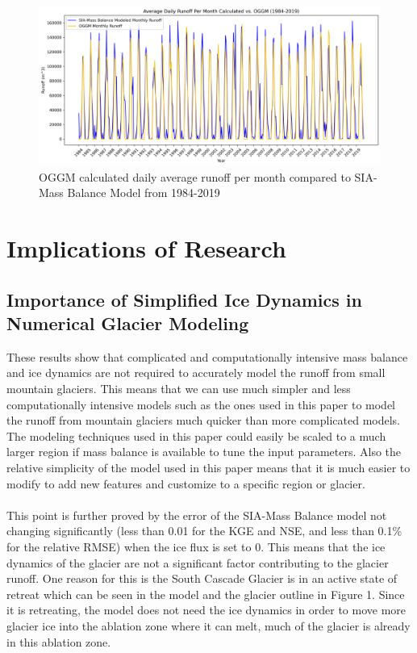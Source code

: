 \documentclass{article}
\begin{document}
\begin{figure}[h!]
    \includegraphics[width=1.3\textwidth]{Plots/oggm_vs_calculated.png}
    \caption{OGGM calculated daily average runoff per month compared to SIA-Mass Balance Model from 1984-2019}
    \label{fig:oggm_model_run_1984_2019}
\end{figure}
\FloatBarrier

\section{Implications of Research}
\subsection{Importance of Simplified Ice Dynamics in Numerical Glacier Modeling}
These results show that complicated and computationally intensive mass balance and ice dynamics are not required to accurately model the 
runoff from small mountain glaciers. This means that we can use much simpler and less computationally intensive models such as the ones used 
in this paper to model the runoff from mountain glaciers much quicker than more complicated models. The modeling techniques used in this paper could 
easily be scaled to a much larger region if mass balance is available to tune the input parameters. Also the relative simplicity of the model used in 
this paper means that it is much easier to modify to add new features and customize to a specific region or glacier.
\paragraph{}
This point is further proved by the error of the SIA-Mass Balance model not changing significantly (less than 0.01 for the KGE and NSE, and less than 
0.1\% for the relative RMSE) when 
the ice flux is set to 0. This means that the ice dynamics of the glacier are not a significant factor contributing to the glacier runoff. One reason 
for this is the South Cascade Glacier is in an active state of retreat which can be seen in the model and the 
glacier outline in Figure 1. Since it is retreating, the model does not need the ice dynamics in order to move more glacier ice into the ablation zone 
where it can melt, much of the glacier is already in this ablation zone.
\end{document}
